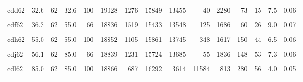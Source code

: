 \begin{landscape}
\begin{ThreePartTable}
\begin{longtable}[t]{lrrrrrrrrrrrrrr}
cdd62 & 32.6 & 62 & 32.6 & 100 & 19028 & 1276 & 15849 & 13455 & 40 & 2280 & 73 & 15 & 7.5 & 0.06\\
\cellcolor{gray!6}{cde62} & \cellcolor{gray!6}{22.0} & \cellcolor{gray!6}{62} & \cellcolor{gray!6}{55.0} & \cellcolor{gray!6}{40} & \cellcolor{gray!6}{18770} & \cellcolor{gray!6}{1788} & \cellcolor{gray!6}{15105} & \cellcolor{gray!6}{12164} & \cellcolor{gray!6}{4} & \cellcolor{gray!6}{2912} & \cellcolor{gray!6}{16} & \cellcolor{gray!6}{12} & \cellcolor{gray!6}{10.6} & \cellcolor{gray!6}{0.07}\\
cdf62 & 36.3 & 62 & 55.0 & 66 & 18836 & 1519 & 15433 & 13548 & 125 & 1686 & 60 & 26 & 9.0 & 0.07\\
\cellcolor{gray!6}{cdg62} & \cellcolor{gray!6}{44.0} & \cellcolor{gray!6}{62} & \cellcolor{gray!6}{55.0} & \cellcolor{gray!6}{80} & \cellcolor{gray!6}{18843} & \cellcolor{gray!6}{1219} & \cellcolor{gray!6}{15739} & \cellcolor{gray!6}{13597} & \cellcolor{gray!6}{37} & \cellcolor{gray!6}{1916} & \cellcolor{gray!6}{182} & \cellcolor{gray!6}{49} & \cellcolor{gray!6}{7.2} & \cellcolor{gray!6}{0.07}\\
cdh62 & 55.0 & 62 & 55.0 & 100 & 18852 & 1105 & 15861 & 13745 & 348 & 1617 & 150 & 44 & 6.5 & 0.06\\
\cellcolor{gray!6}{cdi62} & \cellcolor{gray!6}{34.0} & \cellcolor{gray!6}{62} & \cellcolor{gray!6}{85.0} & \cellcolor{gray!6}{40} & \cellcolor{gray!6}{18775} & \cellcolor{gray!6}{1833} & \cellcolor{gray!6}{15064} & \cellcolor{gray!6}{12689} & \cellcolor{gray!6}{68} & \cellcolor{gray!6}{2229} & \cellcolor{gray!6}{78} & \cellcolor{gray!6}{4} & \cellcolor{gray!6}{10.8} & \cellcolor{gray!6}{0.08}\\
cdj62 & 56.1 & 62 & 85.0 & 66 & 18839 & 1231 & 15724 & 13685 & 55 & 1836 & 148 & 53 & 7.3 & 0.06\\
\cellcolor{gray!6}{cdk62} & \cellcolor{gray!6}{68.0} & \cellcolor{gray!6}{62} & \cellcolor{gray!6}{85.0} & \cellcolor{gray!6}{80} & \cellcolor{gray!6}{18850} & \cellcolor{gray!6}{936} & \cellcolor{gray!6}{16029} & \cellcolor{gray!6}{8099} & \cellcolor{gray!6}{6471} & \cellcolor{gray!6}{1275} & \cellcolor{gray!6}{184} & \cellcolor{gray!6}{25} & \cellcolor{gray!6}{5.5} & \cellcolor{gray!6}{0.06}\\
cdl62 & 85.0 & 62 & 85.0 & 100 & 18866 & 687 & 16292 & 3614 & 11584 & 813 & 280 & 56 & 4.0 & 0.05\\
\cellcolor{gray!6}{cdm62} & \cellcolor{gray!6}{44.0} & \cellcolor{gray!6}{62} & \cellcolor{gray!6}{110.0} & \cellcolor{gray!6}{40} & \cellcolor{gray!6}{18829} & \cellcolor{gray!6}{0} & \cellcolor{gray!6}{16946} & \cellcolor{gray!6}{12983} & \cellcolor{gray!6}{0} & \cellcolor{gray!6}{3756} & \cellcolor{gray!6}{207} & \cellcolor{gray!6}{6} & \cellcolor{gray!6}{0.0} & \cellcolor{gray!6}{0.00}\\

\end{longtable}
\end{ThreePartTable}
\end{landscape}
